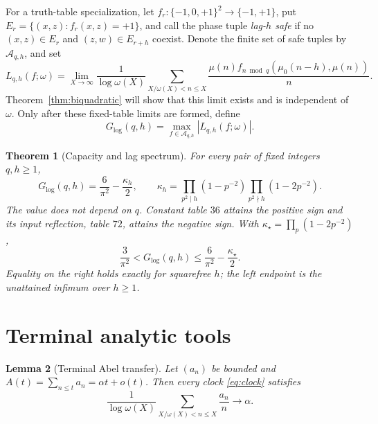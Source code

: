 \documentclass[11pt]{article}
\newtheorem{theorem}{Theorem}[section]
\newtheorem{lemma}[theorem]{Lemma}
\theoremstyle{definition}
\theoremstyle{remark}
\newcommand{\T}{\{-1,0,+1\}}
\newcommand{\mob}{\mu}
\newcommand{\kap}{\kappa}
\newcommand{\Glog}{G_{\log}}
\begin{document}
For a truth-table specialization, let \(f_r:\T^2\to\{-1,+1\}\), put
\(E_r=\{(x,z):f_r(x,z)=+1\}\), and call the phase tuple \emph{lag-\(h\)
safe} if no \((x,z)\in E_r\) and \((z,w)\in E_{r+h}\) coexist.  Denote the
finite set of safe tuples by \(\mathcal A_{q,h}\), and set
\begin{equation}
 L_{q,h}(f;\omega)=\lim_{X\to\infty}\frac1{\log\omega(X)}
 \sum_{X/\omega(X)<n\le X}
 \frac{\mob(n)f_{n\bmod q}(\mob_0(n-h),\mob(n))}{n}.
 \label{eq:score}
\end{equation}
Theorem~\ref{thm:biquadratic} will show that this limit exists and is
independent of \(\omega\).  Only after these fixed-table limits are formed,
define
\begin{equation}
 \Glog(q,h)=\max_{f\in\mathcal A_{q,h}}|L_{q,h}(f;\omega)|.
 \label{eq:capacity-def}
\end{equation}

\begin{theorem}[Capacity and lag spectrum]
\label{thm:capacity}
For every pair of fixed integers \(q,h\ge1\),
\begin{equation}
 \boxed{\Glog(q,h)=\frac6{\pi^2}-\frac{\kap_h}{2}},\qquad
 \kap_h=\prod_{p^2\mid h}(1-p^{-2})
          \prod_{p^2\nmid h}(1-2p^{-2}).
 \label{eq:capacity}
\end{equation}
The value does not depend on \(q\).  Constant table \(36\) attains the
positive sign and its input reflection, table \(72\), attains the negative
sign.  With \(\kap_\star=\prod_p(1-2p^{-2})\),
\begin{equation}
 \frac3{\pi^2}<\Glog(q,h)\le
 \frac6{\pi^2}-\frac{\kap_\star}{2}.
 \label{eq:range}
\end{equation}
Equality on the right holds exactly for squarefree \(h\); the left endpoint
is the unattained infimum over \(h\ge1\).
\end{theorem}

\section{Terminal analytic tools}

\begin{lemma}[Terminal Abel transfer]
\label{lem:abel}
Let \((a_n)\) be bounded and
\(A(t)=\sum_{n\le t}a_n=\alpha t+o(t)\).  Then every clock
\eqref{eq:clock} satisfies
\begin{equation}
 \frac1{\log\omega(X)}\sum_{X/\omega(X)<n\le X}\frac{a_n}{n}
 \longrightarrow\alpha.
 \label{eq:abel}
\end{equation}
\end{lemma}
\end{document}
